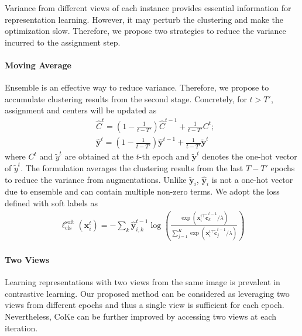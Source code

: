 \documentclass[10pt,twocolumn,letterpaper]{article}
\def \x {\mathbf{x}}
\def \cc {\mathbf{c}}
\def \y {\mathbf{y}}
\def \y {\mathbf{y}}
\begin{document}
Variance from different views of each instance provides essential information for representation learning. However, it may perturb the clustering and make the optimization slow. Therefore, we propose two strategies to reduce the variance incurred to the assignment step.

\paragraph{Moving Average}
Ensemble is an effective way to reduce variance. Therefore, we propose to accumulate clustering results from the second stage. Concretely, for $t>T'$, assignment and centers will be updated as
\begin{eqnarray*}
&\hat{C}^{t} = (1-\frac{1}{t-T'})\hat{C}^{t-1}+\frac{1}{t-T'}C^{t}; \nonumber\\
&\hat{\y}^{t} = (1-\frac{1}{t-T'})\hat{\y}^{t-1}+\frac{1}{t-T'}\tilde{\y}^{t}
\end{eqnarray*}
where $C^{t}$ and $\tilde{y}^t$ are obtained at the $t$-th epoch and $\tilde{\y}^t$ denotes the one-hot vector of $\tilde{y}^t$. The formulation averages the clustering results from the last $T-T'$ epochs to reduce the variance from augmentations. Unlike $\tilde{\y}_i$, $\hat{\y}_i$ is not a one-hot vector due to ensemble and can contain multiple non-zero terms. We adopt the loss defined with soft labels as
\begin{eqnarray*}
\ell_{\mathrm{cls}}^{\mathrm{soft}}(\x_i^{t}) = -\sum_{k}\hat{\y}_{i,k}^{t-1}\log(\frac{\exp(\x_i^{t\top} \tilde{\cc}_{k}^{t-1}/\lambda)}{\sum_{j=1}^K \exp(\x_i^{t\top} \tilde{\cc}_{j}^{t-1}/\lambda)})
\end{eqnarray*}

\paragraph{Two Views}
Learning representations with two views from the same image is prevalent in contrastive learning. Our proposed method can be considered as leveraging two views from different epochs and thus a single view is sufficient for each epoch. Nevertheless, CoKe can be further improved by accessing two views at each iteration. 
\end{document}
